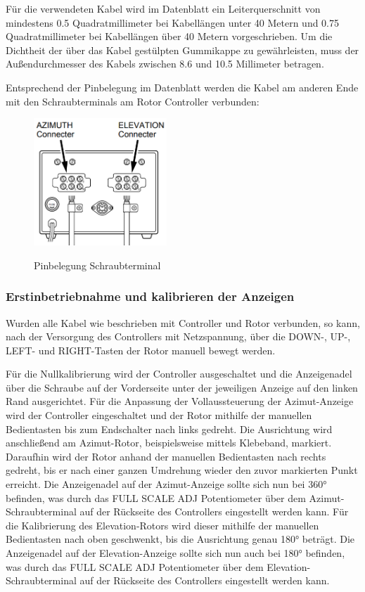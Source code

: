 Für die verwendeten Kabel wird im Datenblatt \cite{noauthor_yaesu_nodate} ein Leiterquerschnitt von mindestens 0.5 Quadratmillimeter bei Kabellängen unter 40 Metern und 0.75 Quadratmillimeter bei Kabellängen über 40 Metern vorgeschrieben. Um die Dichtheit der über das Kabel gestülpten Gummikappe zu gewährleisten, muss der Außendurchmesser des Kabels zwischen 8.6 und 10.5 Millimeter betragen.
 
Entsprechend der Pinbelegung im Datenblatt \cite{noauthor_yaesu_nodate} werden die Kabel am anderen Ende mit den Schraubterminals am Rotor Controller verbunden:
\begin{figure}[H]
	\centering
	\includegraphics[width=5cm]{../ref/RotorInstallationScrewTerminal.png}
	\label{fig:Rotor_Schraubterminal}
	\caption{Pinbelegung Schraubterminal \cite{noauthor_yaesu_nodate}}
\end{figure}

\subsubsection{Erstinbetriebnahme und kalibrieren der Anzeigen}
Wurden alle Kabel wie beschrieben mit Controller und Rotor verbunden, so kann, nach der Versorgung des Controllers mit Netzspannung, über die DOWN-, UP-, LEFT- und RIGHT-Tasten der Rotor manuell bewegt werden.

Für die  Nullkalibrierung wird der Controller ausgeschaltet und die Anzeigenadel über die Schraube auf der Vorderseite unter der jeweiligen Anzeige auf den linken Rand ausgerichtet. Für die Anpassung der Vollaussteuerung der Azimut-Anzeige wird der Controller eingeschaltet und der Rotor mithilfe der manuellen Bedientasten bis zum Endschalter nach links gedreht. Die Ausrichtung wird anschließend am Azimut-Rotor, beispielsweise mittels Klebeband, markiert. Daraufhin wird der Rotor anhand der manuellen Bedientasten nach rechts gedreht, bis er nach einer ganzen Umdrehung wieder den zuvor markierten Punkt erreicht. Die Anzeigenadel auf der Azimut-Anzeige sollte sich nun bei 360° befinden, was durch das FULL SCALE ADJ Potentiometer über dem Azimut-Schraubterminal auf der Rückseite des Controllers eingestellt werden kann. Für die Kalibrierung des Elevation-Rotors wird dieser mithilfe der manuellen Bedientasten nach oben geschwenkt, bis die Ausrichtung genau 180° beträgt. Die Anzeigenadel auf der Elevation-Anzeige sollte sich nun auch bei 180° befinden, was durch das FULL SCALE ADJ Potentiometer über dem Elevation-Schraubterminal auf der Rückseite des Controllers eingestellt werden kann.

